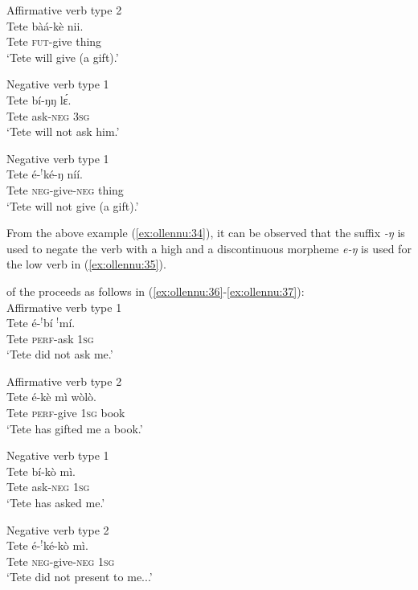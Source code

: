 \documentclass[output=paper,newtxmath,modfonts,nonflat,draftmode]{langsci/langscibook}
\begin{document}
\ea Affirmative verb type 2
\label{ex:ollennu:33}\\
\gll Tete bàá-kè nii.\\
Tete \textsc{fut}-give thing\\
\glt `Tete will give (a gift).'\\
\z



\ea Negative verb type 1 \\ \label{ex:ollennu:34}
\gll Tete bí-ŋŋ l\'ɛ.\\
Tete ask-\textsc{neg} 3\textsc{sg}\\
\glt `Tete will not ask him.'
\z


\ea Negative verb type 1 \\ \label{ex:ollennu:35}
\gll Tete é-$^{!}$ké-ŋ níí.\\
Tete \textsc{neg}-give-\textsc{neg} thing\\
\glt `Tete will not give (a gift).'\\
\z

From the above example (\ref{ex:ollennu:34}), it can be observed that the suffix \textit{-ŋ} is used to negate the verb with a high  and a discontinuous morpheme \textit{e-ŋ} is used for the low  verb in (\ref{ex:ollennu:35}).

 of the  proceeds as follows in (\ref{ex:ollennu:36}-\ref{ex:ollennu:37}):\\

\ea Affirmative verb type 1 \\\label{ex:ollennu:36}
\gll Tete é-$^{!}$bí $^{!}$mí.\\
Tete \textsc{perf}-ask 1\textsc{sg}\\
\glt `Tete did not ask me.'
\z


\ea Affirmative verb type 2 \\ \label{ex:ollennu:37}
\gll Tete é-kè mì wòlò.\\
Tete \textsc{perf}-give 1\textsc{sg} book\\
\glt `Tete has gifted me a book.'
\z


\ea Negative verb type 1 \\ \label{ex:ollennu:38}
\gll Tete bí-kò mì.\\
Tete ask-\textsc{neg} 1\textsc{sg}\\
\glt `Tete has asked me.'
\z


\ea Negative verb type 2 \\  \label{ex:ollennu:39}
 \gll Tete é-$^{!}$ké-kò mì.\\
Tete \textsc{neg}-give-\textsc{neg} 1\textsc{sg}\\
\glt `Tete did not present to me...'
\z
 
\end{document}
